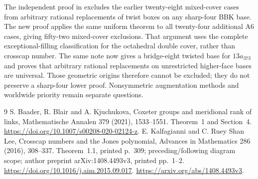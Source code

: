 \documentclass[11pt]{article}
\begin{document}
The independent proof in 
excludes the earlier twenty-eight mixed-cover cases from arbitrary
rational replacements of twist boxes on any sharp-four BBK base.
The new proof  applies the same uniform
theorem to all twenty-four additional A6 cases, giving fifty-two
mixed-cover exclusions. That argument uses the complete
exceptional-filling classification for the octahedral double cover,
rather than crosscap number.
The same note now gives a bridge-eight twisted base for $13a_{373}$
and proves that arbitrary rational replacements on unrestricted
higher-face bases are universal. Those geometric origins therefore
cannot be excluded; they do not preserve a sharp-four lower proof.
Nonsymmetric augmentation methods and worldwide priority remain
separate questions.

\begin{thebibliography}{9}
S. Baader, R. Blair and A. Kjuchukova,
Coxeter groups and meridional rank of links,
Mathematische Annalen 379 (2021), 1533--1551.
Theorem~1 and Section~4.
\url{https://doi.org/10.1007/s00208-020-02124-z}.
E. Kalfagianni and C. Ruey Shan Lee,
Crosscap numbers and the Jones polynomial,
Advances in Mathematics 286 (2016), 308--337.
Theorem~1.1, printed p.~309; preceding/following diagram scope;
author preprint arXiv:1408.4493v3, printed pp.~1--2.
\url{https://doi.org/10.1016/j.aim.2015.09.017}.
\url{https://arxiv.org/abs/1408.4493v3}.
\end{thebibliography}
\end{document}
